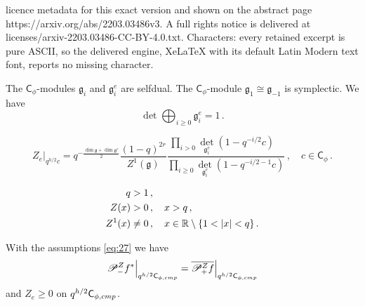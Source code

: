 \documentclass[10pt,a4paper]{amsart}
\newcommand{\R}{\mathbb{R}}
\newcommand{\bC}{\mathsf{C}}
\newcommand{\cP}{\mathscr{P}}
\newcommand{\comp}{\textup{cmp}}
\newcommand{\fg}{\mathfrak{g}}
\begin{document}
licence metadata for this exact version and shown on the abstract page https://arxiv.org/abs/2203.03486v3. A full rights notice is delivered at licenses/arxiv-2203.03486-CC-BY-4.0.txt. Characters: every retained excerpt is pure ASCII, so the delivered engine, XeLaTeX with its default Latin Modern text font, reports no missing character.
  \begin{Lemma}\label{l_selfdual}
    The $\bC_\phi$-modules $\fg_i$ and $\fg_i^e$ are selfdual.
    The $\bC_\phi$-module $\fg_1\cong \fg_{-1}$ is symplectic.
    We have
    \[
      \det \bigoplus_{i \ge 0} \fg_i^e = 1 \,. 
    \]
\end{Lemma}

    \begin{equation}
      \label{eq:30}
      Z_e \big|_{q^{h/2} c} = q^{-\frac{\dim \fg + \dim \fg^e}{2}} \frac{(1-q)^{2r}}{Z^1(\fg)}
      \frac{\prod_{i>0} \det_{\fg_i^e} (1-q^{-i/2} c )\phantom{\,\,\,\,\,}}
      {\prod_{i\ge 0} \det_{\fg_i^e}(1-q^{-i/2-1} c)} \,, \quad c \in \bC_{\phi} \,. 
    \end{equation}

 \begin{align}
   q &>1 \,, \notag \\
   Z(x)&> 0\,, \quad x>q \,,  \label{eq:27} \\
   Z^1(x)&\ne 0\,,\quad  x \in \R \setminus \{1 < |x| < q\} \label{eq:27bis}
         \,. 
 \end{align}

 \begin{Proposition}\label{p_even} 
   With the assumptions \eqref{eq:27} we have
   \[
     \cP_{-}^Z f^* \Big|_{q^{h/2} \bC_{\phi,\comp}} =
   \overline{\cP_{+}^Z f} \Big|_{q^{h/2} \bC_{\phi,\comp}}
   \]
 and $Z_e \ge 0$ on $q^{h/2} \bC_{\phi,\comp}$. 
\end{Proposition}
\end{document}
